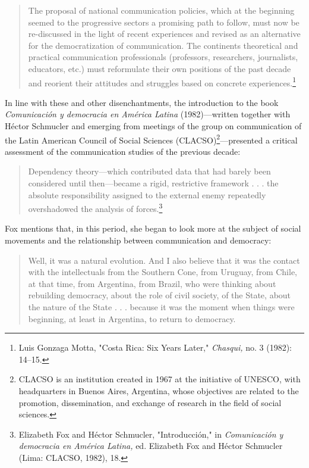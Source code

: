 \documentclass{tufte-handout}
\begin{document}
\begin{quote}
The proposal of national communication policies, which at the beginning
seemed to the progressive sectors a promising path to follow, must now
be re-discussed in the light of recent experiences and revised as an
alternative for the democratization of communication. The
continent\textquotesingle s theoretical and practical communication
professionals (professors, researchers, journalists, educators, etc.)
must reformulate their own positions of the past decade and reorient
their attitudes and struggles based on concrete experiences.\footnote{Luis
  Gonzaga Motta, "Costa Rica: Six Years Later," \emph{Chasqui,} no. 3
  (1982): 14--15.}
\end{quote}

\noindent In line with these and other disenchantments, the introduction to the
book \emph{Comunicación y democracia en América Latina} (1982)---written
together with Héctor Schmucler and emerging from meetings of the group
on communication of the Latin American Council of Social Sciences
(CLACSO)\footnote{CLACSO is an institution created in 1967 at the
  initiative of UNESCO, with headquarters in Buenos Aires, Argentina,
  whose objectives are related to the promotion, dissemination, and
  exchange of research in the field of social sciences.}---presented a
critical assessment of the communication studies of the previous decade:

\begin{quote}
Dependency theory---which contributed data that had barely been
considered until then---became a rigid, restrictive framework . . . the
absolute responsibility assigned to the external enemy repeatedly
overshadowed the analysis of forces.\footnote{Elizabeth Fox and Héctor
  Schmucler, "Introducción," in \emph{Comunicación y democracia en
  América Latina,} ed. Elizabeth Fox and Héctor Schmucler (Lima: CLACSO,
  1982), 18.}
\end{quote}

\noindent Fox mentions that, in this period, she began to look more at the subject
of social movements and the relationship between communication and
democracy:

\begin{quote}
Well, it was a natural evolution. And I also believe that it was the
contact with the intellectuals from the Southern Cone, from Uruguay,
from Chile, at that time, from Argentina, from Brazil, who were thinking
about rebuilding democracy, about the role of civil society, of the
State, about the nature of the State . . . because it was the moment
when things were beginning, at least in Argentina, to return to
democracy.
\end{quote}
\end{document}
